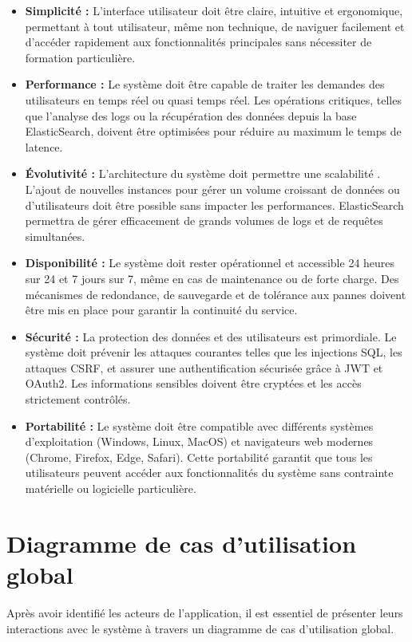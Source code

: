 \begin{itemize}[label=\textbullet]
    \item \textbf{Simplicité :} 
    L'interface utilisateur doit être claire, intuitive et ergonomique, permettant à tout utilisateur, même non technique, de naviguer facilement et d’accéder rapidement aux fonctionnalités principales sans nécessiter de formation particulière.
    
    \item \textbf{Performance :} 
    Le système doit être capable de traiter les demandes des utilisateurs en temps réel ou quasi temps réel. Les opérations critiques, telles que l’analyse des logs ou la récupération des données depuis la base ElasticSearch, doivent être optimisées pour réduire au maximum le temps de latence.
    
    \item \textbf{Évolutivité :} 
    L’architecture du système doit permettre une scalabilité . L’ajout de nouvelles instances pour gérer un volume croissant de données ou d’utilisateurs doit être possible sans impacter les performances. ElasticSearch permettra de gérer efficacement de grands volumes de logs et de requêtes simultanées.
    
    \item \textbf{Disponibilité :} 
    Le système doit rester opérationnel et accessible 24 heures sur 24 et 7 jours sur 7, même en cas de maintenance ou de forte charge. Des mécanismes de redondance, de sauvegarde et de tolérance aux pannes doivent être mis en place pour garantir la continuité du service.
    
    \item \textbf{Sécurité :} 
    La protection des données et des utilisateurs est primordiale. Le système doit prévenir les attaques courantes telles que les injections SQL, les attaques CSRF, et assurer une authentification sécurisée grâce à JWT et OAuth2. Les informations sensibles doivent être cryptées et les accès strictement contrôlés.
    
    \item \textbf{Portabilité :} 
    Le système doit être compatible avec différents systèmes d’exploitation (Windows, Linux, MacOS) et navigateurs web modernes (Chrome, Firefox, Edge, Safari). Cette portabilité garantit que tous les utilisateurs peuvent accéder aux fonctionnalités du système sans contrainte matérielle ou logicielle particulière.
\end{itemize}


\section{Diagramme de cas d’utilisation global}
Après avoir identifié les acteurs de l’application, il est essentiel de présenter leurs interactions avec le système à travers un diagramme de cas d’utilisation global.

